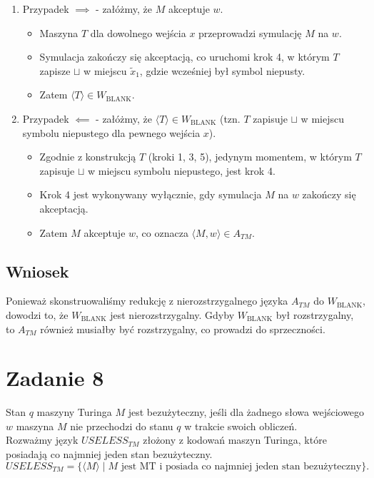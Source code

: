 \documentclass{article}
\begin{document}
\begin{enumerate}
    \item Przypadek $\implies$ - załóżmy, że $M$ akceptuje $w$.
    \begin{itemize}
        \item Maszyna $T$ dla dowolnego wejścia $x$ przeprowadzi symulację $M$ na $w$.
        \item Symulacja zakończy się akceptacją, co uruchomi krok 4, w którym $T$ zapisze $\sqcup$ w miejscu $\tilde{x}_1$, gdzie wcześniej był symbol niepusty.
        \item Zatem $\langle T \rangle \in W_{\mathrm{BLANK}}$.
    \end{itemize}

    \item Przypadek $\impliedby$ - załóżmy, że $\langle T \rangle \in W_{\mathrm{BLANK}}$ (tzn. $T$ zapisuje $\sqcup$ w miejscu symbolu niepustego dla pewnego wejścia $x$).
    \begin{itemize}
        \item Zgodnie z konstrukcją $T$ (kroki 1, 3, 5), jedynym momentem, w którym $T$ zapisuje $\sqcup$ w miejscu symbolu niepustego, jest krok 4.
        \item Krok 4 jest wykonywany wyłącznie, gdy symulacja $M$ na $w$ zakończy się akceptacją.
        \item Zatem $M$ akceptuje $w$, co oznacza $\langle M, w \rangle \in A_{TM}$.
    \end{itemize}
\end{enumerate}



\subsection*{Wniosek}

Ponieważ skonstruowaliśmy redukcję z nierozstrzygalnego języka $A_{TM}$ do $W_{\mathrm{BLANK}}$, dowodzi to, że $W_{\mathrm{BLANK}}$ jest nierozstrzygalny. Gdyby $W_{\mathrm{BLANK}}$ był rozstrzygalny, to $A_{TM}$ również musiałby być rozstrzygalny, co prowadzi do sprzeczności.

\section{Zadanie 8}

Stan $q$ maszyny Turinga $M$ jest bezużyteczny, jeśli dla żadnego słowa wejściowego $w$ maszyna $M$ nie przechodzi do stanu $q$ w trakcie swoich obliczeń.
\\
Rozważmy język $USELESS_{TM}$ złożony z kodowań maszyn Turinga, które posiadają co najmniej jeden stan bezużyteczny.
\[
USELESS_{TM} = \{\langle M \rangle \mid M \text{ jest MT i posiada co najmniej jeden stan bezużyteczny}\}.
\]
\end{document}
